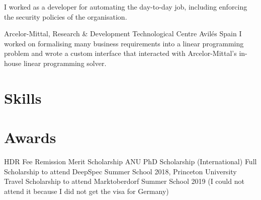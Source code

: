 \documentclass[11pt,a4paper,sans]{moderncv}        %
\begin{document}
{I worked as a developer for automating the day-to-day job,  including enforcing the security policies of the organisation.}

 {Arcelor-Mittal, Research \& Development Technological Centre} {Avil{\'e}s} {Spain} 
{I worked on formalising many business requirements into a linear programming problem and wrote a 
 custom interface that interacted with Arcelor-Mittal's in-house linear programming solver.}


\section{Skills}




\section{Awards}
\cvitem{} {HDR Fee Remission Merit Scholarship}
\cvitem{} {ANU PhD Scholarship (International)}
\cvitem{} {Full Scholarship to attend DeepSpec Summer School 2018, Princeton University}
\cvitem{} {Travel Scholarship to attend Marktoberdorf Summer School 2019 (I could not attend it because I did not get the 
visa for Germany)}
\end{document}
